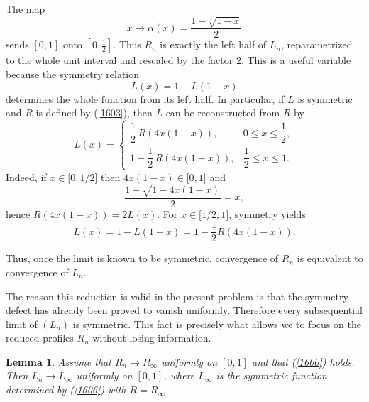 \documentclass[onecolumn]{article}
\newtheorem{lemma}[theorem]{Lemma}
\begin{document}
The map 
\begin{equation}
x\longmapsto \alpha (x)=\frac{1-\sqrt{1-x}}{2}  \label{1604}
\end{equation}%
sends $[0,1]$ onto $[0,\frac{1}{2}]$. Thus $R_{n}$ is exactly the left half
of $L_{n}$, reparametrized to the whole unit interval and rescaled by the
factor $2$. This is a useful variable because the symmetry relation 
\begin{equation}
L(x)=1-L(1-x)  \label{1605}
\end{equation}%
determines the whole function from its left half. In particular, if $L$ is
symmetric and $R$ is defined by (\ref{1603}), then $L$ can be reconstructed
from $R$ by 
\begin{equation}
L(x)=%
\begin{cases}
\dfrac{1}{2}\,R\!(4x(1-x)), & 0\leq x\leq \dfrac{1}{2}, \\[1.2ex] 
1-\dfrac{1}{2}\,R\!(4x(1-x)), & \dfrac{1}{2}\leq x\leq 1.%
\end{cases}
\label{1606}
\end{equation}%
Indeed, if $x\in \lbrack 0,1/2]$ then $4x(1-x)\in \lbrack 0,1]$ and 
\begin{equation}
\frac{1-\sqrt{1-4x(1-x)}}{2}=x,  \label{1607}
\end{equation}%
hence $R(4x(1-x))=2L(x)$. For $x\in \lbrack 1/2,1]$, symmetry yields 
\begin{equation}
L(x)=1-L(1-x)=1-\frac{1}{2}R\!(4x(1-x)).  \label{1608}
\end{equation}

Thus, once the limit is known to be symmetric, convergence of $R_n$ is
equivalent to convergence of $L_n$.

The reason this reduction is valid in the present problem is that the
symmetry defect has already been proved to vanish uniformly. Therefore every
subsequential limit of $(L_{n})$ is symmetric. This fact is precisely what
allows we to focus on the reduced profiles $R_{n}$ without losing
information.

\begin{lemma}
\label{R-convergence-implies-L-convergence} Assume that $R_{n}\rightarrow
R_{\infty }$ uniformly on $[0,1]$ and that (\ref{1600}) holds. Then $%
L_{n}\rightarrow L_{\infty }$ uniformly on $[0,1]$, where $L_{\infty }$ is
the symmetric function determined by (\ref{1606}) with $R=R_{\infty }$.
\end{lemma}
\end{document}
